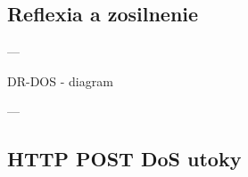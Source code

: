 \documentclass[
  printed, %
  table,   %
  lof,     %
  lot,     %
]{fithesis3}
\begin{document}
\subsection{Reflexia a zosilnenie}

---

DR-DOS - diagram

---


\subsection{HTTP POST DoS utoky}
\end{document}
